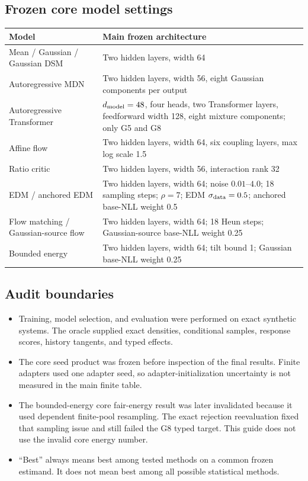 \documentclass[11pt]{article}
\begin{document}
\subsection{Frozen core model settings}

\begin{center}
\small
\begin{tabularx}{\linewidth}{@{}l X@{}}
\toprule
Model & Main frozen architecture \\
\midrule
Mean / Gaussian / Gaussian DSM & Two hidden layers, width 64 \\
Autoregressive MDN & Two hidden layers, width 56, eight Gaussian components per output \\
Autoregressive Transformer & $d_{\rm model}=48$, four heads, two Transformer layers,
feedforward width 128, eight mixture components; only G5 and G8 \\
Affine flow & Two hidden layers, width 64, six coupling layers, max log scale 1.5 \\
Ratio critic & Two hidden layers, width 56, interaction rank 32 \\
EDM / anchored EDM & Two hidden layers, width 64; noise $0.01$--$4.0$; 18 sampling
steps; $\rho=7$; EDM $\sigma_{\rm data}=0.5$; anchored base-NLL weight 0.5 \\
Flow matching / Gaussian-source flow & Two hidden layers, width 64; 18 Heun steps;
Gaussian-source base-NLL weight 0.25 \\
Bounded energy & Two hidden layers, width 64; tilt bound 1; Gaussian base-NLL weight
0.25 \\
\bottomrule
\end{tabularx}
\end{center}

\subsection{Audit boundaries}

\begin{itemize}
  \item Training, model selection, and evaluation were performed on exact synthetic
        systems.  The oracle supplied exact densities, conditional samples, response
        scores, history tangents, and typed effects.
  \item The core seed product was frozen before inspection of the final results.
        Finite adapters used one adapter seed, so adapter-initialization uncertainty is
        not measured in the main finite table.
  \item The bounded-energy core fair-energy result was later invalidated because it
        used dependent finite-pool resampling.  The exact rejection reevaluation fixed
        that sampling issue and still failed the G8 typed target.  This guide does not
        use the invalid core energy number.
  \item ``Best'' always means best among tested methods on a common frozen estimand.
        It does not mean best among all possible statistical methods.
\end{itemize}
\end{document}
